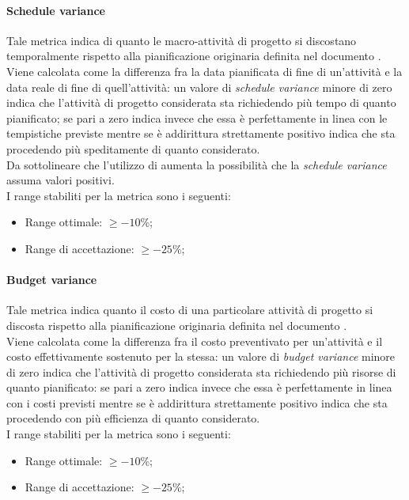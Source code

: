 			\paragraph[Schedule variance]{\hypertarget{sv}{Schedule variance}}
			Tale metrica indica di quanto le macro-attività di progetto si discostano temporalmente rispetto alla pianificazione originaria definita nel documento \PdP . 
			\\Viene calcolata come la
differenza fra la data pianificata di fine di un’attività e la data
reale di fine di quell’attività: un valore di \textit{schedule variance} minore di zero indica che l'attività di progetto considerata sta richiedendo più tempo di quanto pianificato; se pari a zero indica invece che essa è perfettamente in linea con le tempistiche previste mentre se è addirittura strettamente positivo indica che sta procedendo più speditamente di quanto considerato. 
			\\Da sottolineare che l'utilizzo di  aumenta la possibilità che la \textit{schedule variance} assuma valori positivi.
			\\I range stabiliti per la metrica sono i seguenti:
				\begin{itemize}
					\item Range ottimale: $\geq{-10}$\%;
					\item Range di accettazione: $\geq{-25}$\%;
				\end{itemize}

			\paragraph[Budget variance]{\hypertarget{bv}{Budget variance}}
			Tale metrica indica quanto il costo di una particolare attività di progetto si discosta rispetto alla pianificazione originaria definita nel documento \PdP. 
			\\Viene calcolata come la differenza fra il costo preventivato per un'attività e il costo effettivamente sostenuto per la stessa: un valore di \textit{budget variance} minore di zero indica che l'attività di progetto considerata sta richiedendo più risorse di quanto pianificato: se pari a zero indica invece che essa è perfettamente in linea con i costi previsti mentre se è addirittura strettamente positivo indica che sta procedendo con più efficienza di quanto considerato.
			\\I range stabiliti per la metrica sono i seguenti:
				\begin{itemize}
					\item Range ottimale: $\geq{-10}$\%;
					\item Range di accettazione: $\geq{-25}$\%;
				\end{itemize}
				
